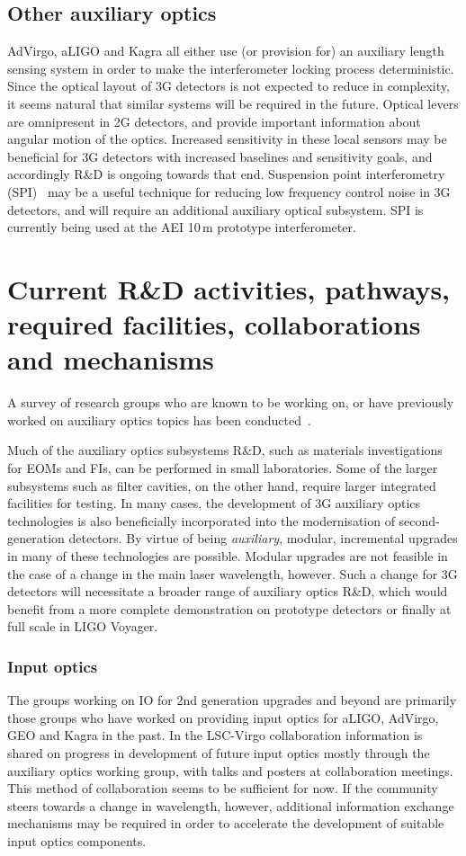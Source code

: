 \subsection{Other auxiliary optics}
AdVirgo, aLIGO and Kagra all either use (or provision for) an auxiliary length sensing system in order to make the interferometer locking process deterministic. Since the optical layout of 3G detectors is not expected to reduce in complexity, it seems natural that similar systems will be required in the future. Optical levers are  omnipresent in 2G detectors, and provide important information about angular motion of the optics. Increased sensitivity in these local sensors may be beneficial for 3G detectors with increased baselines and sensitivity goals, and accordingly R\&D is ongoing towards that end. Suspension point interferometry (SPI)~\cite{SPI} may be a useful technique for reducing low frequency control noise in 3G detectors, and will require an additional auxiliary optical subsystem. SPI is currently being used at the AEI 10\,m prototype interferometer.   

\section{Current R\&D activities, pathways, required facilities, collaborations\\ and mechanisms}
A survey of research groups who are known to be working on, or have previously worked on auxiliary optics topics has been conducted~\cite{AuxActivitiesTable}.

Much of the auxiliary optics subsystems R\&D, such as materials investigations for EOMs and FIs, can be performed in small laboratories. 
Some of the larger subsystems such as filter cavities, on the other hand, require larger integrated facilities for testing. In many cases, the development of 3G auxiliary optics technologies is also beneficially incorporated into the modernisation of second-generation detectors. By virtue of being \emph{auxiliary}, modular, incremental upgrades in many of these technologies are possible. Modular upgrades are not feasible in the case of a change in the main laser wavelength, however. Such a change for 3G detectors will necessitate a broader range of auxiliary optics R\&D, which would benefit from a more complete demonstration on prototype detectors or finally at full scale in LIGO Voyager.

\subsubsection{\bf Input optics} The groups working on IO for 2nd generation upgrades and beyond are primarily those groups who have worked on providing input optics for aLIGO, AdVirgo, GEO and Kagra in the past. In the LSC-Virgo collaboration information is shared on progress in development of future input optics mostly through the auxiliary optics working group, with talks and posters at collaboration meetings. This method of collaboration seems to be sufficient for now. If the community steers towards a change in wavelength, however, additional information exchange mechanisms may be required in order to accelerate the development of suitable input optics components.

